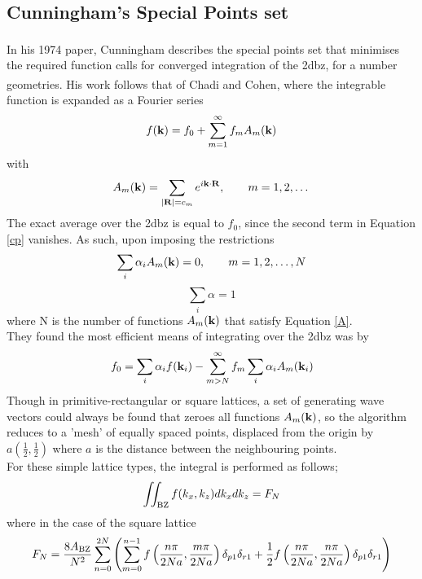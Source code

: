 \documentclass[a4paper, 12pt]{article}
\begin{document}
	\subsection{Cunningham's Special Points set}\label{points}
	In his 1974 paper\textcolor{blue}{\textsuperscript{\cite{CP}}}, Cunningham describes the special points set that minimises the required function calls for converged integration of the \gls{2dbz}, for a number geometries. His work follows that of Chadi and Cohen\textcolor{blue}{\textsuperscript{\cite{CC}}}, where the integrable function is expanded as a Fourier series
	\begin{equation}\label{cp}
		f({\bf k})=f_0 +\sum_{m=1}^\infty f_m A_m({\bf k})
	\end{equation}
	with
	\begin{equation}
		A_m({\bf k})=\sum_{|{\bf R}|=c_m}e^{i\bf k \cdot R},\qquad m=1,2,\dots
	\end{equation}
	The exact average over the \gls{2dbz} is equal to $f_0$, since the second term in Equation \eqref{cp} vanishes. As such, upon imposing the restrictions
	\begin{equation}\label{A}
		\sum_i \alpha_i A_m({\bf k})=0, \qquad m = 1,2,\dots,N 
	\end{equation}
	\begin{equation}
	\sum_i \alpha = 1	
	\end{equation}
	where N is the number of functions $A_m({\bf k})$ that satisfy Equation \eqref{A}.\\
	They found the most efficient means of integrating over the \gls{2dbz} was by
	\begin{equation}
		f_0 = \sum_i \alpha_i f({\bf k}_i) - \sum_{m> N}^\infty f_m \sum_i \alpha_i A_m({\bf k}_i)
	\end{equation}
	Though in primitive-rectangular or square lattices, a set of generating wave vectors could always be found that zeroes all functions $A_m({\bf k})$, so the algorithm reduces to a 'mesh' of equally spaced points, displaced from the origin by $a(\frac{1}{2},\frac{1}{2})$ where $a$ is the distance between the neighbouring points.
	\\[2mm] For these simple lattice types, the integral is performed as follows;
	\begin{equation}
		\iint_{\rm BZ}f(k_x, k_z) dk_xdk_z= F_N
	\end{equation}
	where in the case of the square lattice
	\begin{equation}\label{CPsquare}
		F_N =\frac{8A_{\rm BZ}}{N^2}\sum_{n=0}^{2N}\left(\sum_{m=0}^{n-1} f\left(\frac{n\pi}{2Na}, \frac{m\pi}{2Na}\right)\delta_{p 1}\delta_{r 1}+\frac{1}{2}f\left(\frac{n\pi}{2Na}, \frac{n\pi}{2Na}\right)\delta_{p 1}\delta_{r 1}\right)
	\end{equation}
\end{document}

